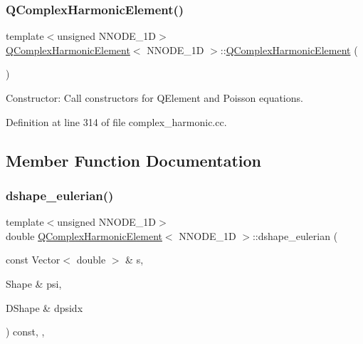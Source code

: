 \subsubsection{\texorpdfstring{Q\+Complex\+Harmonic\+Element()}{QComplexHarmonicElement()}}
{\footnotesize\ttfamily template$<$unsigned N\+N\+O\+D\+E\+\_\+1D$>$ \\
\hyperlink{classQComplexHarmonicElement}{Q\+Complex\+Harmonic\+Element}$<$ N\+N\+O\+D\+E\+\_\+1D $>$\+::\hyperlink{classQComplexHarmonicElement}{Q\+Complex\+Harmonic\+Element} (\begin{DoxyParamCaption}{ }\end{DoxyParamCaption})\hspace{0.3cm}{\ttfamily [inline]}}



Constructor\+: Call constructors for Q\+Element and Poisson equations. 



Definition at line 314 of file complex\+\_\+harmonic.\+cc.



\subsection{Member Function Documentation}
\mbox{\label{classQComplexHarmonicElement_a7c97d4e8c5433a44640d30c936d69ffb}} 
\subsubsection{\texorpdfstring{dshape\+\_\+eulerian()}{dshape\_eulerian()}}
{\footnotesize\ttfamily template$<$unsigned N\+N\+O\+D\+E\+\_\+1D$>$ \\
double \hyperlink{classQComplexHarmonicElement}{Q\+Complex\+Harmonic\+Element}$<$ N\+N\+O\+D\+E\+\_\+1D $>$\+::dshape\+\_\+eulerian (\begin{DoxyParamCaption}\item[{const Vector$<$ double $>$ \&}]{s,  }\item[{Shape \&}]{psi,  }\item[{D\+Shape \&}]{dpsidx }\end{DoxyParamCaption}) const\hspace{0.3cm}{\ttfamily [inline]}, {\ttfamily [protected]}, {\ttfamily [virtual]}}



